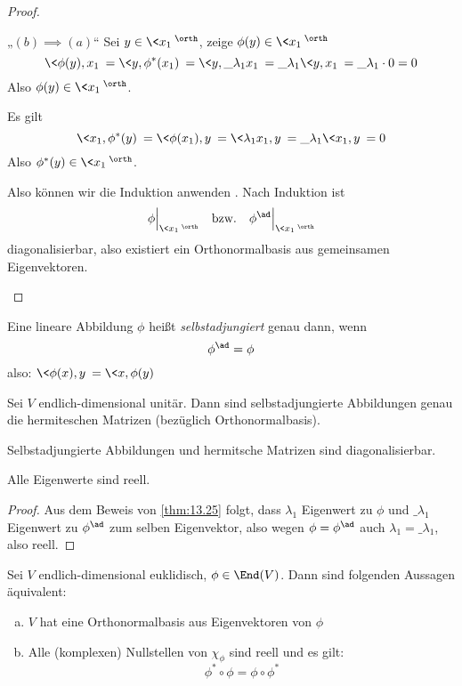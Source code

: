 \documentclass[a4paper, 10pt]{scrbook}
\begin{document}
\begin{thm}
\begin{proof}
\begin{seg}{„$(b)\implies (a)$“}
			Sei $y\in \<x_1\>^\orth$, zeige $\phi(y)\in \<x_1\>^\orth$
			\[
				\<\phi(y),x_1\> = \<y,\phi^*(x_1)\> = \<y,\_\lambda_1x_1\> = \_\lambda_1 \<y,x_1\> = \_\lambda_1 \cdot 0 = 0
			\]
			Also $\phi(y) \in \<x_1\>^\orth$.

			Es gilt
			\[
				\<x_1,\phi^*(y)\> = \<\phi(x_1),y\> = \<\lambda_1x_1,y\> = \_\lambda_1 \<x_1,y\> = 0
			\]
			Also $\phi^*(y) \in \<x_1\>^\orth$.

			Also können wir die Induktion anwenden .
			Nach Induktion ist
			\[
				\phi\Big|_{\<x_1\>^\orth} \quad \text{bzw.} \quad \phi^{\ad}\Big|_{\<x_1\>^\orth}
			\]
			diagonalisierbar, also existiert ein Orthonormalbasis aus gemeinsamen Eigenvektoren.
		\end{seg}
	\end{proof}
\end{thm}

\begin{df}
	\label{df:13.26}
	Eine lineare Abbildung $\phi$ heißt \emph{selbstadjungiert} genau dann, wenn
	\[
		\phi^{\ad} = \phi
	\]
	also: $\<\phi(x),y\> = \<x,\phi(y)\>$
\end{df}

\begin{kor}[Spektralsatz]
	\label{kor:13.27}
	Sei $V$ endlich-dimensional unitär.
	Dann sind selbstadjungierte Abbildungen genau die hermiteschen Matrizen (bezüglich Orthonormalbasis).

	Selbstadjungierte Abbildungen und hermitsche Matrizen sind diagonalisierbar.

	Alle Eigenwerte sind reell.
	\begin{proof}
		Aus dem Beweis von \ref{thm:13.25} folgt, dass $\lambda_1$ Eigenwert zu $\phi$ und $\_\lambda_1$ Eigenwert zu $\phi^{\ad}$ zum selben Eigenvektor, also wegen $\phi=\phi^{\ad}$ auch $\lambda_1 = \_\lambda_1$, also reell.

		\fixme[Rest?]
	\end{proof}
\end{kor}

\begin{kor}
	\label{kor:13.28}
	Sei $V$ endlich-dimensional euklidisch, $\phi\in \End(V)$.
	Dann sind folgenden Aussagen äquivalent:
	\begin{enumerate}[(a)]
		\item
			$V$ hat eine Orthonormalbasis aus Eigenvektoren von $\phi$
		\item
			Alle (komplexen) Nullstellen von $\chi_\phi$ sind reell und es gilt:
			\[
				\phi^*\circ \phi = \phi\circ \phi^*
			\]
	\end{enumerate}
\end{kor}
\end{document}
